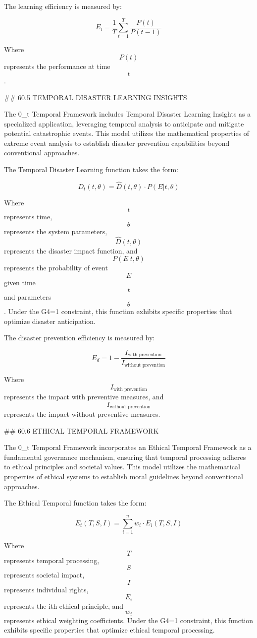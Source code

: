 The learning efficiency is measured by:

$$ E_l = \frac{1}{T} \sum_{t=1}^{T} \frac{P(t)}{P(t-1)} $$

Where $$ P(t) $$ represents the performance at time $$ t $$.

## 60.5 TEMPORAL DISASTER LEARNING INSIGHTS

The 0_t Temporal Framework includes Temporal Disaster Learning Insights as a specialized application, leveraging temporal analysis to anticipate and mitigate potential catastrophic events. This model utilizes the mathematical properties of extreme event analysis to establish disaster prevention capabilities beyond conventional approaches.

The Temporal Disaster Learning function takes the form:

$$ D_t(t, \theta) = \hat{D}(t, \theta) \cdot P(E|t, \theta) $$

Where $$ t $$ represents time, $$ \theta $$ represents the system parameters, $$ \hat{D}(t, \theta) $$ represents the disaster impact function, and $$ P(E|t, \theta) $$ represents the probability of event $$ E $$ given time $$ t $$ and parameters $$ \theta $$. Under the G4=1 constraint, this function exhibits specific properties that optimize disaster anticipation.

The disaster prevention efficiency is measured by:

$$ E_d = 1 - \frac{I_{\text{with prevention}}}{I_{\text{without prevention}}} $$

Where $$ I_{\text{with prevention}} $$ represents the impact with preventive measures, and $$ I_{\text{without prevention}} $$ represents the impact without preventive measures.

## 60.6 ETHICAL TEMPORAL FRAMEWORK

The 0_t Temporal Framework incorporates an Ethical Temporal Framework as a fundamental governance mechanism, ensuring that temporal processing adheres to ethical principles and societal values. This model utilizes the mathematical properties of ethical systems to establish moral guidelines beyond conventional approaches.

The Ethical Temporal function takes the form:

$$ E_t(T, S, I) = \sum_{i=1}^{n} w_i \cdot E_i(T, S, I) $$

Where $$ T $$ represents temporal processing, $$ S $$ represents societal impact, $$ I $$ represents individual rights, $$ E_i $$ represents the ith ethical principle, and $$ w_i $$ represents ethical weighting coefficients. Under the G4=1 constraint, this function exhibits specific properties that optimize ethical temporal processing.

